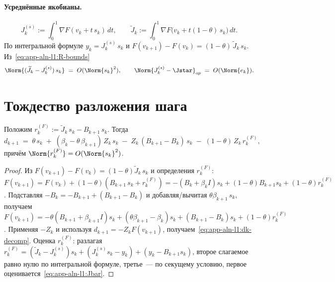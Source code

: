 \paragraph{Усреднённые якобианы.}
\begin{equation}
J_k^{(s)} := \int_0^1 \nabla F(v_k + t\, s_k)\,dt,
\qquad
\widetilde J_k := \int_0^1 \nabla F\bigl(v_k + t(1-\theta)\,s_k\bigr)\,dt.
\label{eq:app-aln-l1:avg-J}
\end{equation}
По интегральной формуле $y_k = J_k^{(s)}\,s_k$ и $F(v_{k+1}) - F(v_k) =
(1-\theta)\,\widetilde J_k\,s_k$. Из~\eqref{eq:app-aln-l1:R-bounds}
\begin{equation}
\Norm{(\widetilde J_k - J_k^{(s)})\,s_k} \;=\; O(\Norm{s_k}^{2}),
\qquad
\Norm{J_k^{(s)} - \Jstar}_{op} \;=\; O(\Norm{e_k}).
\label{eq:app-aln-l1:Jbar}
\end{equation}

\section{Тождество разложения шага}
\label{sec:app-aln-l1:identity}

\begin{lemma}
\label{lem:app-aln-l1:identity}
Положим $r_k^{(F)} := \widetilde J_k\,s_k - B_{k+1}\,s_k$. Тогда
\begin{equation}
d_{k+1} \;=\; \theta\,s_k \;+\; (\beta_k - \theta\,\beta_{k+1})\,Z_k\,s_k
\;-\; Z_k\,(B_{k+1} - B_k)\,s_k \;-\; (1-\theta)\,Z_k\,r_k^{(F)},
\label{eq:app-aln-l1:dk-decomp}
\end{equation}
причём $\Norm{r_k^{(F)}} = O(\Norm{s_k}^{2})$.
\end{lemma}

\begin{proof}
Из $F(v_{k+1}) - F(v_k) = (1-\theta)\widetilde J_k\,s_k$ и определения
$r_k^{(F)}$:
$F(v_{k+1}) = F(v_k) + (1-\theta)(B_{k+1}\,s_k + r_k^{(F)})
= -(B_k+\beta_k I)s_k + (1-\theta)B_{k+1}s_k + (1-\theta)r_k^{(F)}$.
Подставляя $-B_k = -B_{k+1} + (B_{k+1}-B_k)$ и добавляя/вычитая
$\theta\beta_{k+1}\,s_k$, получаем
$F(v_{k+1}) = -\theta(B_{k+1}+\beta_{k+1}I)s_k + (\theta\beta_{k+1}-\beta_k)s_k
+ (B_{k+1}-B_k)s_k + (1-\theta)r_k^{(F)}$. Применяя $-Z_k$ и используя
$d_{k+1} = -Z_k F(v_{k+1})$, получаем~\eqref{eq:app-aln-l1:dk-decomp}.
Оценка $r_k^{(F)}$: разлагая $r_k^{(F)} = (\widetilde J_k - J_k^{(s)})s_k +
(J_k^{(s)}s_k - y_k) + (y_k - B_{k+1}s_k)$, второе слагаемое равно нулю
по интегральной формуле, третье~--- по секущему условию, первое
оценивается~\eqref{eq:app-aln-l1:Jbar}.
\end{proof}

